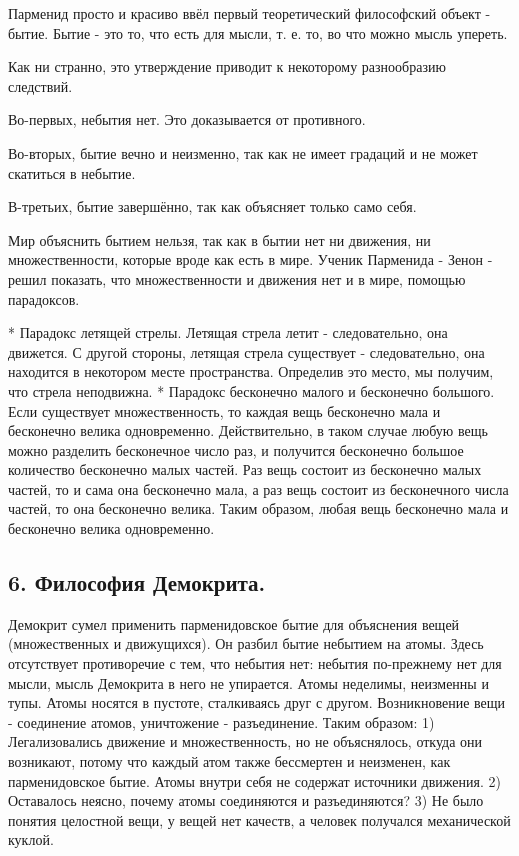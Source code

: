 \documentclass[a4paper, 12pt]{article}
\begin{document}
Парменид просто и красиво ввёл первый теоретический философский объект - бытие.
Бытие - это то, что есть для мысли, т. е. то, во что можно мысль упереть.

Как ни странно, это утверждение приводит к некоторому разнообразию следствий.

Во-первых, небытия нет.
Это доказывается от противного.

Во-вторых, бытие вечно и неизменно, так как не имеет градаций и не может скатиться в небытие.

В-третьих, бытие завершённо, так как объясняет только само себя.

Мир объяснить бытием нельзя, так как в бытии нет ни движения, ни множественности, которые вроде как есть в мире.
Ученик Парменида - Зенон - решил показать, что множественности и движения нет и в мире,  помощью парадоксов.

* Парадокс летящей стрелы.
Летящая стрела летит - следовательно, она движется.
С другой стороны, летящая стрела существует - следовательно, она находится в некотором месте пространства.
Определив это место, мы получим, что стрела неподвижна.
* Парадокс бесконечно малого и бесконечно большого.
Если существует множественность, то каждая вещь бесконечно мала и бесконечно велика одновременно.
Действительно, в таком случае любую вещь можно разделить бесконечное число раз, и получится бесконечно большое количество бесконечно малых частей.
Раз вещь состоит из бесконечно малых частей, то и сама она бесконечно мала, а раз вещь состоит из бесконечного числа частей, то она бесконечно велика.
Таким образом, любая вещь бесконечно мала и бесконечно велика одновременно.


\subsection*{\textbf{6. Философия Демокрита.}}
Демокрит сумел применить парменидовское бытие для объяснения вещей (множественных и движущихся).
Он разбил бытие небытием на атомы.
Здесь отсутствует противоречие с тем, что небытия нет: небытия по-прежнему нет для мысли, мысль Демокрита в него не упирается.
Атомы неделимы, неизменны и тупы.
Атомы носятся в пустоте, сталкиваясь друг с другом.
Возникновение вещи - соединение атомов, уничтожение - разъединение.
Таким образом:
1) Легализовались движение и множественность, но не объяснялось, откуда они возникают, потому что каждый атом также бессмертен и неизменен, как парменидовское бытие.
Атомы внутри себя не содержат источники движения.
2) Оставалось неясно, почему атомы соединяются и разъединяются?
3) Не было понятия целостной вещи, у вещей нет качеств, а человек получался механической куклой.
\end{document}
